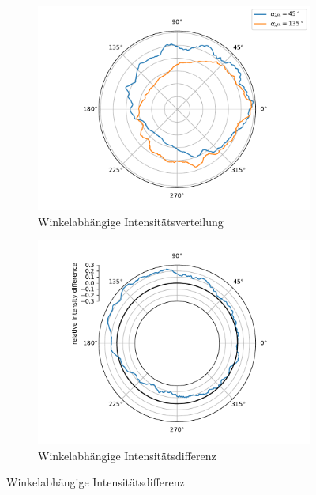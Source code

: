 \documentclass[titlepage,  ngerman]{article}
\begin{document}
		\begin{figure}		
			\begin{subfigure}[b]{0.5\textwidth}
				\centering
				\includegraphics[width=\textwidth]{figures/spin_hall/bfp_angular_distribution_45_135.pdf}
				\caption{Winkelabhängige Intensitätsverteilung}
				\label{fig:angular_int_bfp}
			\end{subfigure}
			\hfill
			\begin{subfigure}[b]{0.49\textwidth}
				\centering
				\includegraphics[width=\textwidth]{figures/spin_hall/bfp_angular_distribution_diff_45_135.pdf}
				\caption{Winkelabhängige Intensitätsdifferenz}
				\label{fig:angular_int_diff_bfp}
			\end{subfigure}

\end{figure}
\end{document}
